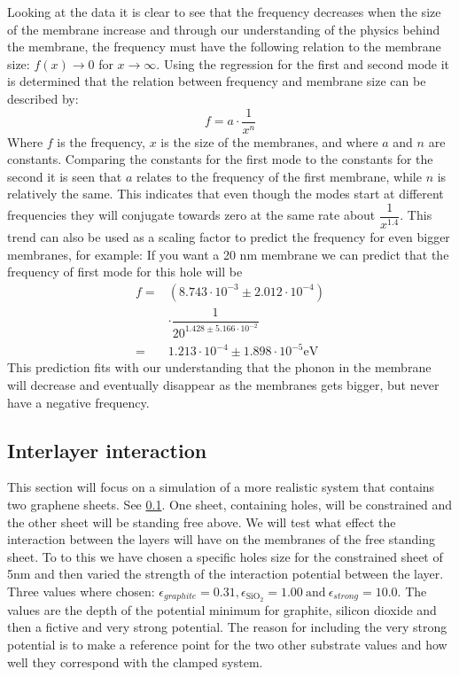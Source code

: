Looking at the data it is clear to see that the frequency decreases when the size of the membrane increase and through our understanding of the physics behind the membrane, the frequency must have the following relation to the membrane size: $f(x)\rightarrow0$ for $x\rightarrow\infty$. Using the regression for the first and second mode it is determined that the relation between frequency and membrane size can be described by:\begin{equation}
    f=a\cdot\dfrac{1}{x^n}
\end{equation}Where $f$ is the frequency, $x$ is the size of the membranes, and where $a$ and $n$ are constants. Comparing the constants for the first mode to the constants for the second it is seen that $a$ relates to the frequency of the first membrane, while $n$ is relatively the same. This indicates that even though the modes start at different frequencies they will conjugate towards zero at the same rate about $\dfrac{1}{x^{1.4}}$. This trend can also be used as a scaling factor to predict the frequency for even bigger membranes, for example: If you want a 20 nm membrane we can predict that the frequency of first mode for this hole will be
    \begin{align}
     f = & \left(8.743\cdot10^{-3}\pm2.012\cdot10^{-4}\right)\\
    & \cdot\dfrac{1}{20^{1.428\pm5.166\cdot10^{-2}}}\\
    = & 1.213\cdot10^{-4}\pm 1.898\cdot 10^{-5} \mathrm{eV}
    \end{align}
This prediction fits with our understanding that the phonon in the membrane will decrease and eventually disappear as the membranes gets bigger, but never have a negative frequency.

\subsection{Interlayer interaction}
This section will focus on a simulation of a more realistic system that contains two graphene sheets. See \cref{}. One sheet, containing holes, will be constrained and the other sheet will be standing free above. We will test what effect the interaction between the layers will have on the membranes of the free standing sheet. To to this we have chosen a specific holes size for the constrained sheet of 5nm and then varied the strength of the interaction potential between the layer. Three values where chosen: $\epsilon_{graphite}=0.31, \epsilon_{\text{SiO}_{2}}=1.00 \ \text{and} \ \epsilon_{strong}=10.0$. The values are the depth of the potential minimum for graphite, silicon dioxide and then a fictive and very strong potential. The reason for including the very strong potential is to make a reference point for the two other substrate values and how well they correspond with the clamped system. 
\onecolumngrid

